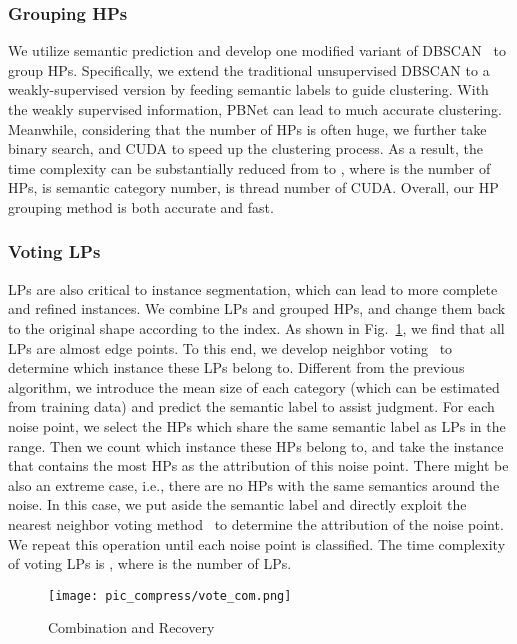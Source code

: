 \documentclass[10pt,twocolumn,letterpaper]{article}
\begin{document}
\subsubsection{Grouping HPs}
We utilize semantic prediction and develop one modified variant of DBSCAN~\cite{ester1996density} to group  HPs. Specifically, we extend the traditional unsupervised DBSCAN 
to a weakly-supervised version by feeding semantic labels to guide clustering. With the weakly supervised information, PBNet can lead to much accurate clustering. Meanwhile, considering that the number of HPs is often huge, we further take binary search, and CUDA to speed up the clustering process. As a result, the time complexity can be substantially reduced from  to , where  is the number of HPs,  is semantic category number,  is thread number of CUDA. Overall, our HP grouping method is both accurate and fast.

\subsubsection{Voting LPs}
LPs are also critical to instance segmentation, which can lead to more complete and refined instances.  We combine LPs and grouped HPs, and change them back to the original shape according to the index. As shown in Fig.~\ref{fig:vote_com}, we find that all LPs are almost edge points. To this end, we develop neighbor voting~\cite{zhang2007ml} to determine which instance these LPs belong to. Different from the previous algorithm, we introduce the mean size of each category  (which can be estimated from training data) and predict the semantic label to assist judgment. For each noise point, we select the HPs which share the same semantic label as LPs in the  range. Then we count which instance these HPs belong to, and take the instance that contains the most HPs as the attribution of this noise point. There might be also an extreme case,  i.e., there are no HPs with the same semantics around the noise. In this case, we put aside the semantic label and directly exploit the nearest neighbor voting method~\cite{talavera2018big} to determine the attribution of the noise point. We repeat this operation until each noise point is classified. The time complexity of voting LPs is , where  is the number of LPs.

\begin{figure}[ht]
\centering
\texttt{[image: pic\_compress/vote\_com.png]}
\caption{\label{fig:vote_com} Combination and Recovery}
\end{figure}
\end{document}
